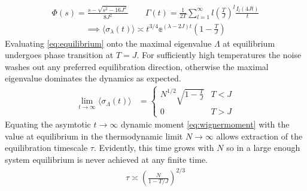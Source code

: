 \documentclass{article}[12pt]
\numberwithin{equation}{section}
\begin{document}
\vspace{-30pt}
\begin{align}
  \Phi(s)=\frac{s-\sqrt{s^2-16J^2}}{8J^2}\qquad
  \Gamma(t)=\frac{1}{2T}
  \sum_{l=1}^{\infty}l\left(\frac{T}{J}\right)^{l}\frac{I_{l}(4Jt)}{t}
\end{align}
\vspace{-20pt}
\begin{align}
  \implies
  \langle \sigma_{\lambda}(t)\rangle
  \asymp
  t^{3/4}\mathbb{e}^{(\lambda-2J)t}\left(1-\frac{T}{J}\right)\label{eq:wignermoment}
\end{align}
Evaluating \eqref{eq:equilibrium} onto the maximal eigenvalue $\Lambda$ at equilibrium
undergoes phase transition at $T=J$. For sufficiently high temperatures the
noise washes out any preferred equilibration direction, otherwise the maximal
eigenvalue dominates the dynamics as expected.
\begin{align}
  \lim_{t\rightarrow\infty}\langle \sigma_{\Lambda}(t)\rangle
  &=\begin{cases}
  N^{1/2}\sqrt{1-\frac{T}{J}} & T<J\\
  0 & T>J
  \end{cases}
  \label{eq:eqilibrium}
\end{align}
Equating the asymtotic $t\rightarrow\infty$ dynamic moment \eqref{eq:wignermoment}
with the value at
equilibrium in the thermodynamic limit $N\rightarrow\infty$ allows extraction
of the equilibration timescale $\tau$. Evidently, this time grows with $N$
so in a large enough system equilibrium is never achieved at any finite time.
\begin{align}
  \tau\asymp
  \left(\frac{N}{1-T/J}\right)^{2/3}
\end{align}
\end{document}
